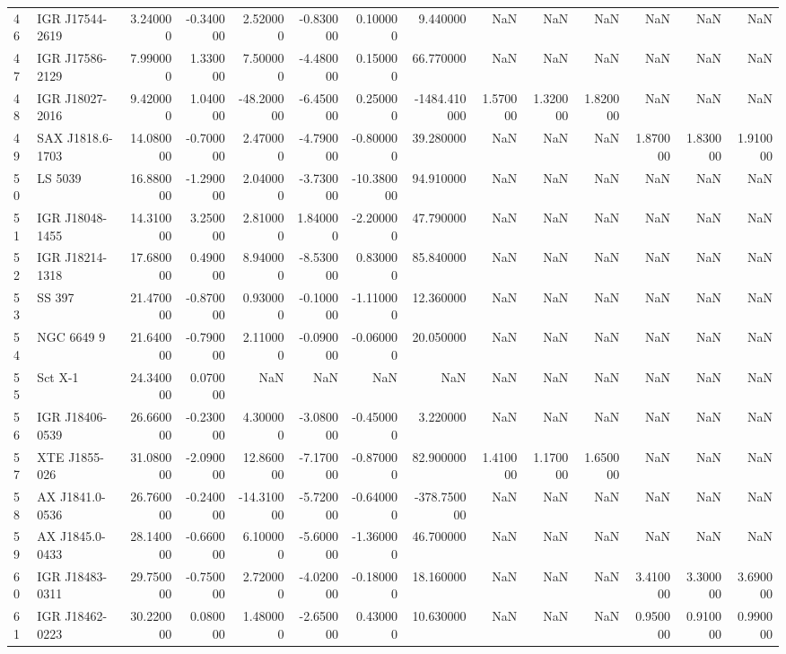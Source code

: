 \begin{tabular}{llrrrrrrrrrrrr}
46 & IGR J17544-2619 & 3.240000 & -0.340000 & 2.520000 & -0.830000 & 0.100000 & 9.440000 & NaN & NaN & NaN & NaN & NaN & NaN \\
47 & IGR J17586-2129 & 7.990000 & 1.330000 & 7.500000 & -4.480000 & 0.150000 & 66.770000 & NaN & NaN & NaN & NaN & NaN & NaN \\
48 & IGR J18027-2016 & 9.420000 & 1.040000 & -48.200000 & -6.450000 & 0.250000 & -1484.410000 & 1.570000 & 1.320000 & 1.820000 & NaN & NaN & NaN \\
49 & SAX J1818.6-1703 & 14.080000 & -0.700000 & 2.470000 & -4.790000 & -0.800000 & 39.280000 & NaN & NaN & NaN & 1.870000 & 1.830000 & 1.910000 \\
50 & LS 5039 & 16.880000 & -1.290000 & 2.040000 & -3.730000 & -10.380000 & 94.910000 & NaN & NaN & NaN & NaN & NaN & NaN \\
51 & IGR J18048-1455 & 14.310000 & 3.250000 & 2.810000 & 1.840000 & -2.200000 & 47.790000 & NaN & NaN & NaN & NaN & NaN & NaN \\
52 & IGR J18214-1318 & 17.680000 & 0.490000 & 8.940000 & -8.530000 & 0.830000 & 85.840000 & NaN & NaN & NaN & NaN & NaN & NaN \\
53 & SS 397 & 21.470000 & -0.870000 & 0.930000 & -0.100000 & -1.110000 & 12.360000 & NaN & NaN & NaN & NaN & NaN & NaN \\
54 & NGC 6649 9 & 21.640000 & -0.790000 & 2.110000 & -0.090000 & -0.060000 & 20.050000 & NaN & NaN & NaN & NaN & NaN & NaN \\
55 & Sct X-1 & 24.340000 & 0.070000 & NaN & NaN & NaN & NaN & NaN & NaN & NaN & NaN & NaN & NaN \\
56 & IGR J18406-0539 & 26.660000 & -0.230000 & 4.300000 & -3.080000 & -0.450000 & 3.220000 & NaN & NaN & NaN & NaN & NaN & NaN \\
57 & XTE J1855-026 & 31.080000 & -2.090000 & 12.860000 & -7.170000 & -0.870000 & 82.900000 & 1.410000 & 1.170000 & 1.650000 & NaN & NaN & NaN \\
58 & AX J1841.0-0536 & 26.760000 & -0.240000 & -14.310000 & -5.720000 & -0.640000 & -378.750000 & NaN & NaN & NaN & NaN & NaN & NaN \\
59 & AX J1845.0-0433 & 28.140000 & -0.660000 & 6.100000 & -5.600000 & -1.360000 & 46.700000 & NaN & NaN & NaN & NaN & NaN & NaN \\
60 & IGR J18483-0311 & 29.750000 & -0.750000 & 2.720000 & -4.020000 & -0.180000 & 18.160000 & NaN & NaN & NaN & 3.410000 & 3.300000 & 3.690000 \\
61 & IGR J18462-0223 & 30.220000 & 0.080000 & 1.480000 & -2.650000 & 0.430000 & 10.630000 & NaN & NaN & NaN & 0.950000 & 0.910000 & 0.990000 \\

\end{tabular}
